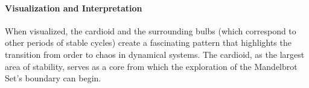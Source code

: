 \documentclass[
]{article}
\begin{document}
\paragraph{Visualization and
Interpretation}\label{visualization-and-interpretation}

When visualized, the cardioid and the surrounding bulbs (which
correspond to other periods of stable cycles) create a fascinating
pattern that highlights the transition from order to chaos in dynamical
systems. The cardioid, as the largest area of stability, serves as a
core from which the exploration of the Mandelbrot Set's boundary can
begin.
\end{document}
